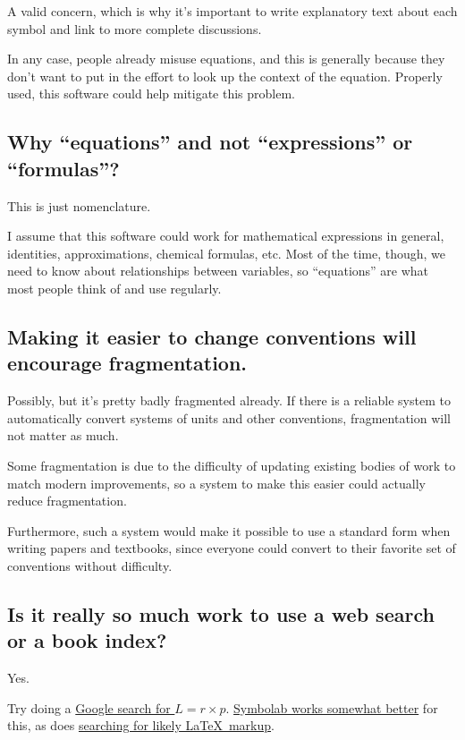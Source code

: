 \documentclass[12pt,letterpaper]{article}
\begin{document}
A valid concern,
which is why it's important to write explanatory text about each symbol
and link to more complete discussions.

In any case, people already misuse equations,
and this is generally because they don't want to put in the effort to look up the context of the equation.
Properly used, this software could help mitigate this problem.

\subsection{Why ``equations'' and not ``expressions'' or ``formulas''?}

This is just nomenclature.

I assume that this software could work for mathematical expressions in general,
identities, approximations, chemical formulas, etc.
Most of the time, though,
we need to know about relationships between variables,
so ``equations'' are what most people think of and use regularly.

\subsection{Making it easier to change conventions will encourage fragmentation.}

Possibly, but it's pretty badly fragmented already.
If there is a reliable system to automatically convert systems of units and other conventions,
fragmentation will not matter as much.

Some fragmentation is due to the difficulty of updating existing bodies of work to match modern improvements,
so a system to make this easier could actually reduce fragmentation.

Furthermore,
such a system would make it possible to use a standard form when writing papers and textbooks,
since everyone could convert to their favorite set of conventions without difficulty.

\subsection{Is it really so much work to use a web search or a book index?}

Yes.

Try doing a
\href{https://www.google.com/search?q=%22L+%3D+r+%C3%97+P%22&oq=%22L+%3D+r+%C3%97+P%22}
{Google search for $L = r \times p$}.
\href{http://symbolab.com/search?origin=suggestion&query=L%3Dr%5Ctimes%20p}
{Symbolab works somewhat better} for this, as does
\href{https://www.google.com/search?&q=%22L+%3D+r+%5Ctimes+P%22&oq=%22L+%3D+r+%5Ctimes+P%22}
{searching for likely \LaTeX\ markup}.
\end{document}
